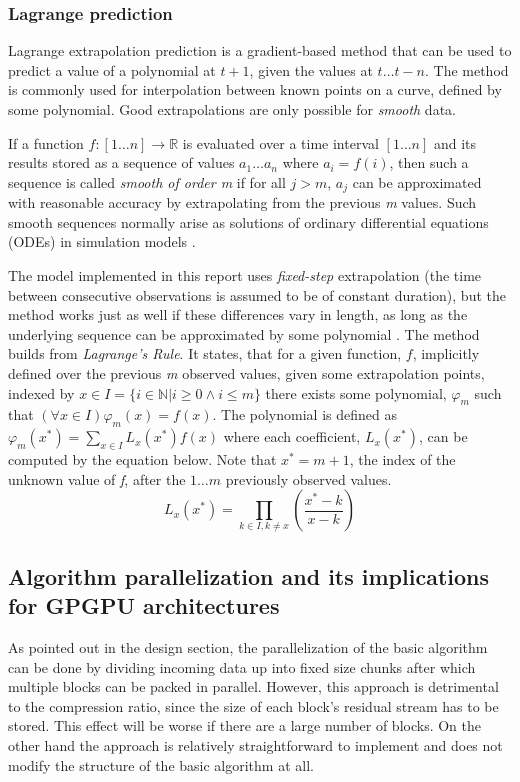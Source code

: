  \subsubsection{Lagrange prediction}
  Lagrange extrapolation prediction is a gradient-based method that can be used to predict a value of a polynomial at $t+1$, given the values at $t\dots t-n$.
  The method is commonly used for interpolation between known points on a curve, defined by some polynomial. Good extrapolations are only possible for 
  \textit{smooth} data.
  
  If a function $f:[1\dots n] \rightarrow \mathbb{R}$ is evaluated over a time interval $[1\dots n]$ and its results stored as a sequence of values 
  $a_{1}\dots a_{n}$ where $a_{i} = f(i)$, then such a sequence is called \textit{smooth of order m} if for all $j>m$, $a_{j}$ can be approximated with reasonable
  accuracy by extrapolating from the previous \textit{m} values. Such smooth sequences normally arise as solutions of ordinary differential equations (ODEs) in
  simulation models \cite{engelson2000lossless}.
  
  The model implemented in this report uses \emph{fixed-step} extrapolation (the time between consecutive observations is assumed to be of constant duration), but
  the method works just as well if these differences vary in length, as long as the underlying sequence can be approximated by some polynomial \cite{engelson2000lossless}. 
  The method builds from \textit{Lagrange's Rule}. It states, that for a given function, $f$, implicitly defined over the previous \textit{m} 
  observed values, given some extrapolation points, indexed by $x\in I = \{i\in\mathbb{N}|i\geq 0\wedge i\leq m\}$ there exists some polynomial, $\varphi_{m}$ such that 
  $(\forall x\in I) \varphi_{m}(x)=f(x)$. The polynomial is defined as $\varphi_{m}(x^{*})=\sum_{x\in I}L_{x}(x^{*})f(x)$ where each coefficient, $L_{x}(x^{*})$, 
  can be computed by the equation below. Note that $x^{*} = m + 1$, the index of the unknown value of \textit{f}, after the $1\dots m$ previously observed values.
  \begin{equation}
   L_{x}(x^{*}) = \prod_{k\in{I},k\neq x}\left(\frac{x^{*}-k}{x-k}\right)
  \end{equation}

 \subsection{Algorithm parallelization and its implications for GPGPU architectures}
  As pointed out in the design section, the parallelization of the basic algorithm can be done by dividing incoming data up into fixed size chunks after which 
  multiple blocks can be packed in parallel. However, this approach is detrimental to the compression ratio, since the size of each block's residual stream has to be stored.
  This effect will be worse if there are a large number of blocks. On the other hand the approach is relatively straightforward to implement and does not modify the structure 
  of the basic algorithm at all.
  
